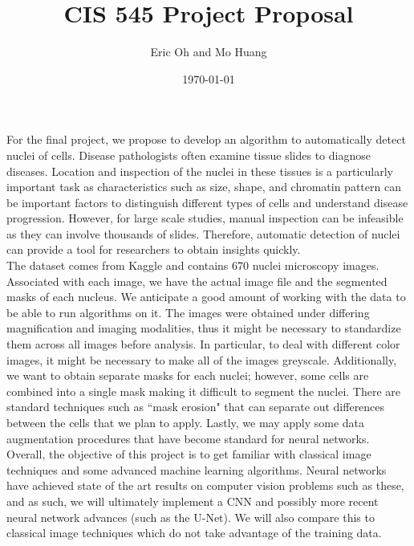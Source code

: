 \documentclass{article}
\title{CIS 545 Project Proposal}
\author{Eric Oh and Mo Huang}
\date{\today}
\begin{document}
\maketitle

For the final project, we propose to develop an algorithm to automatically detect nuclei of cells. Disease pathologists often examine tissue slides to diagnose diseases. Location and inspection of the nuclei in these tissues is a particularly important task as characteristics such as size, shape, and chromatin pattern can be important factors to distinguish different types of cells and understand disease progression. However, for large scale studies, manual inspection can be infeasible as they can involve thousands of slides. Therefore, automatic detection of nuclei can provide a tool for researchers to obtain insights quickly. \\

The dataset comes from Kaggle and contains 670 nuclei microscopy images. Associated with each image, we have the actual image file and the segmented masks of each nucleus. We anticipate a good amount of working with the data to be able to run algorithms on it. The images were obtained under differing magnification and imaging modalities, thus it might be necessary to standardize them across all images before analysis. In particular, to deal with different color images, it might be necessary to make all of the images greyscale. Additionally, we want to obtain separate masks for each nuclei; however, some cells are combined into a single mask making it difficult to segment the nuclei. There are standard techniques such as ``mask erosion" that can separate out differences between the cells that we plan to apply. Lastly, we may apply some data augmentation procedures that have become standard for neural networks. \\

Overall, the objective of this project is to get familiar with classical image techniques and some advanced machine learning algorithms. Neural networks have achieved state of the art results on computer vision problems such as these, and as such, we will ultimately implement a CNN and possibly more recent neural network advances (such as the U-Net). We will also compare this to classical image techniques which do not take advantage of the training data.
\end{document}
